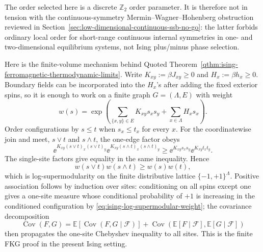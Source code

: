 The order selected here is a discrete \(\mathbb Z_2\) order parameter.  It is
therefore not in tension with the continuous-symmetry
Mermin--Wagner--Hohenberg obstruction reviewed in
Section~\ref{sec:low-dimensional-continuous-ssb-no-go}: the latter forbids
ordinary local order for short-range continuous internal symmetries in
one- and two-dimensional equilibrium systems, not Ising plus/minus phase
selection.

\noindent
Here is the finite-volume mechanism behind
Quoted Theorem~\ref{qthm:ising-ferromagnetic-thermodynamic-limits}.  Write
\(K_{xy}:=\beta J_{xy}\geq0\) and \(H_x:=\beta h_x\geq0\).  Boundary fields
can be incorporated into the \(H_x\)'s after adding the fixed exterior spins,
so it is enough to work on a finite graph \(G=(\Lambda,E)\) with weight
\[
  w(s)
  =
  \exp\left(
    \sum_{\{x,y\}\in E}K_{xy}s_xs_y+\sum_{x\in\Lambda}H_xs_x
  \right).
\]
Order configurations by \(s\leq t\) when \(s_x\leq t_x\) for every \(x\).
For the coordinatewise join and meet, \(s\vee t\) and \(s\wedge t\), the
one-edge factor obeys
\[
  \ee^{K_{xy}(s\vee t)_x(s\vee t)_y}
  \ee^{K_{xy}(s\wedge t)_x(s\wedge t)_y}
  \geq
  \ee^{K_{xy}s_xs_y}\ee^{K_{xy}t_xt_y}.
\]
The single-site factors give equality in the same inequality.  Hence
\begin{equation}
  w(s\vee t)w(s\wedge t)\geq w(s)w(t),
  \label{eq:ising-log-supermodular-weight}
\end{equation}
which is log-supermodularity on the finite distributive lattice
\(\{-1,+1\}^{\Lambda}\).  Positive association follows by induction over
sites: conditioning on all spins except one gives a one-site measure whose
conditional probability of \(+1\) is increasing in the conditioned
configuration by \eqref{eq:ising-log-supermodular-weight}; the covariance
decomposition
\[
  \operatorname{Cov}(F,G)
  =
  \mathbb E\!\left[\operatorname{Cov}(F,G\mid\mathcal F)\right]
  +
  \operatorname{Cov}\!\left(
    \mathbb E[F\mid\mathcal F],
    \mathbb E[G\mid\mathcal F]
  \right)
\]
then propagates the one-site Chebyshev inequality to all sites.  This is the
finite FKG proof in the present Ising setting.

